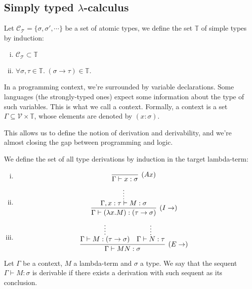 \subsection{Simply typed $\lambda$-calculus}

\begin{mydef}[Type]
Let $\mathcal{C}_{\mathcal{T}} = \{ \sigma, \sigma', \cdots \}$ be a set of atomic types,
we define the set $\mathbb{T}$ of simple types by induction:
\begin{enumerate}[i)]
  \item $\mathcal{C}_{\mathcal{T}} \subset \mathbb{T}$
  \item $\forall \sigma, \tau \in \mathbb{T}. \; (\sigma \rightarrow \tau) \in \mathbb{T}$.
\end{enumerate}
\end{mydef}

In a programming context, we're surrounded by variable declarations. Some languages (the strongly-typed ones)
expect some information about the type of such variables. This is what we call a context.
Formally, a context is a set $\Gamma \subseteq \mathcal{V} \times \mathbb{T}$, whose elements
are denoted by $(x : \sigma)$.

This allows us to define the notion of derivation and derivability, and we're almost closing the
gap between programming and logic.\\

\begin{mydef}[Derivation]
\label{def:simpletypederivation}
We define the set of all type derivations by induction in the target lambda-term:
\begin{enumerate}[i)]
  \item
    \[\vcenter{\infer[(Ax)]{\Gamma \vdash x:\sigma}{}} \]
    
  \item 
    \[\vcenter{\infer[(I\rightarrow)]{\Gamma \vdash (\lambda x.M) : (\tau \rightarrow \sigma)}
							{\infer*{\Gamma, x:\tau \vdash M:\sigma}{}}} \]

  \item 
    \[\vcenter{
			\infer[(E\rightarrow)]
				{\Gamma \vdash MN : \sigma}
				{
					\infer*
						{\Gamma \vdash M:(\tau \rightarrow \sigma)}
						{}
				&
					\infer*
						{\Gamma \vdash N:\tau}
						{}
				}
		
		}\]
\end{enumerate}
\end{mydef}

\begin{mydef}[Derivability]
Let $\Gamma$ be a context, $M$ a lambda-term and $\sigma$ a type. We say that
the sequent $\Gamma \vdash M : \sigma$ is derivable if there exists a derivation with
such sequent as its conclusion.
\end{mydef}

